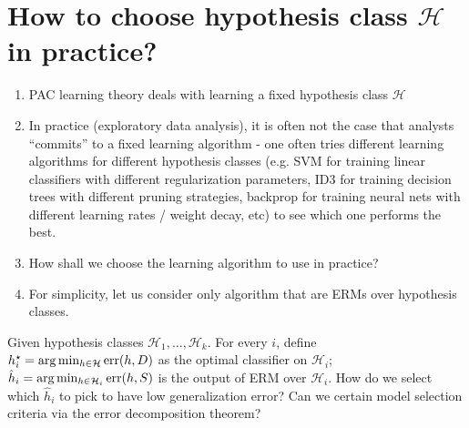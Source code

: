 \documentclass{article}
\newtheorem{theorem}{Theorem}
\DeclareMathOperator*{\err}{{\rm err}}
\newcommand{\Hcal}{\mathcal{H}}
\begin{document}
\section{How to choose hypothesis class $\Hcal$ in practice?}
\begin{enumerate}
\item PAC learning theory deals with learning a fixed hypothesis class $\Hcal$
\item In practice (exploratory data analysis), it is often not the case that analysts ``commits'' to a fixed learning algorithm - one often tries different learning algorithms for different hypothesis classes (e.g. SVM for training linear classifiers with different regularization parameters, ID3 for training decision trees with different pruning strategies, backprop for training neural nets with different learning rates / weight decay, etc) to see which one performs the best.
\item How shall we choose the learning algorithm to use in practice?
\item For simplicity, let us consider only algorithm that are ERMs over hypothesis classes.
\end{enumerate}

Given hypothesis classes $\Hcal_1, \ldots, \Hcal_k$.
For every $i$, define $h_i^\star = \arg\min_{h \in \Hcal} \err(h, D)$ as the optimal classifier on $\Hcal_i$;
$\hat{h}_i = \arg\min_{h \in \Hcal_i} \err(h, S)$ is the output of ERM over $\Hcal_i$.
How do we select which $\hat{h}_i$ to pick to have low generalization error? Can we certain model selection criteria via the error decomposition theorem?



\end{document}

